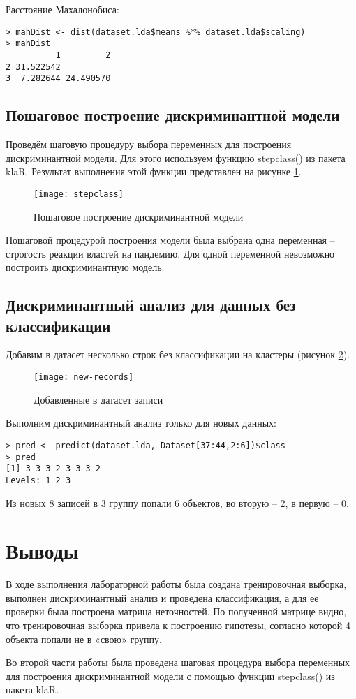 \documentclass[a4paper,14pt]{extarticle}
\begin{document}
Расстояние Махалонобиса:
\begin{lstlisting}
> mahDist <- dist(dataset.lda$means %*% dataset.lda$scaling)
> mahDist
          1         2
2 31.522542          
3  7.282644 24.490570
\end{lstlisting}

\subsection{Пошаговое построение дискриминантной модели}
Проведём шаговую процедуру выбора переменных для построения дискриминантной
модели. Для этого используем функцию stepclass() из пакета klaR. Результат
выполнения этой функции представлен на рисунке \ref{fig:stepclass}.

\begin{figure}[H]
    \centering
    \texttt{[image: stepclass]}
    \caption{Пошаговое построение дискриминантной модели}
    \label{fig:stepclass}
\end{figure}

Пошаговой процедурой построения модели была выбрана одна переменная -- строгость
реакции властей на пандемию. Для одной переменной невозможно построить
дискриминантную модель.

\subsection{Дискриминантный анализ для данных без классификации}
Добавим в датасет несколько строк без классификации на кластеры (рисунок
\ref{fig:new-records}).

\begin{figure}[H]
    \centering
    \texttt{[image: new-records]}
    \caption{Добавленные в датасет записи}
    \label{fig:new-records}
\end{figure}

Выполним дискриминантный анализ только для новых данных:
\begin{lstlisting}
> pred <- predict(dataset.lda, Dataset[37:44,2:6])$class
> pred
[1] 3 3 3 2 3 3 3 2
Levels: 1 2 3
\end{lstlisting}

Из новых 8 записей в 3 группу попали 6 объектов, во вторую -- 2, в первую -- 0.

\section*{Выводы}
В ходе выполнения лабораторной работы была создана тренировочная выборка,
выполнен дискриминантный анализ и проведена классификация, а для ее проверки
была построена матрица неточностей. По полученной матрице видно, что
тренировочная выборка привела к построению гипотезы, согласно которой 4 объекта
попали не в «свою» группу.

Во второй части работы была проведена шаговая процедура выбора переменных для
построения дискриминантной модели с помощью функции stepclass() из пакета klaR.
\end{document}
